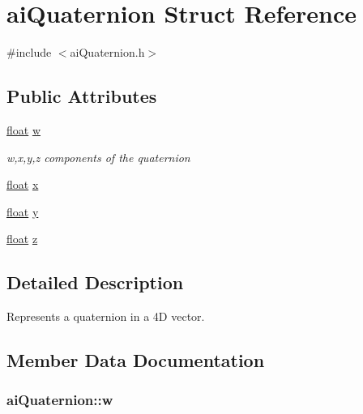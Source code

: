 \hypertarget{structai_quaternion}{\section{ai\-Quaternion Struct Reference}
\label{structai_quaternion}
}


{\ttfamily \#include $<$ai\-Quaternion.\-h$>$}

\subsection*{Public Attributes}
\begin{DoxyCompactItemize}
\item 
\hyperlink{fmod_8h_aeb841aa4b4b5f444b5d739d865b420af}{float} \hyperlink{structai_quaternion_a410b3c46417d67d728a01a5810907a36}{w}
\begin{DoxyCompactList}\small\item\em w,x,y,z components of the quaternion \end{DoxyCompactList}\item 
\hyperlink{fmod_8h_aeb841aa4b4b5f444b5d739d865b420af}{float} \hyperlink{structai_quaternion_af9db21b086c14d8654d62005f740e75f}{x}
\item 
\hyperlink{fmod_8h_aeb841aa4b4b5f444b5d739d865b420af}{float} \hyperlink{structai_quaternion_a1695fefbc60becf95fcafcc08573ab44}{y}
\item 
\hyperlink{fmod_8h_aeb841aa4b4b5f444b5d739d865b420af}{float} \hyperlink{structai_quaternion_acc30da6103d5131fb1bed6640f1eeda0}{z}
\end{DoxyCompactItemize}


\subsection{Detailed Description}
Represents a quaternion in a 4\-D vector. 

\subsection{Member Data Documentation}
\hypertarget{structai_quaternion_a410b3c46417d67d728a01a5810907a36}{
\subsubsection[{w}]{ ai\-Quaternion\-::w}}\label{structai_quaternion_a410b3c46417d67d728a01a5810907a36}


